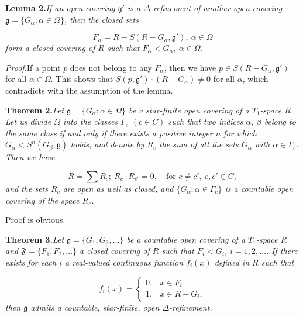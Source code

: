 \documentclass[11pt,a4paper,leqno]{article}
\newcommand{\g}{\mathfrak g}
\newcommand{\f}{\mathfrak F}
\newcommand{\thm}[2]{\par\medskip\textbf{Theorem #1.}\quad\textit{#2}\par}
\newcommand{\lem}[2]{\par\medskip\textbf{Lemma #1.}\quad\textit{#2}\par}
\newcommand{\proof}{\textit{Proof.}\quad}
\begin{document}
\lem{2}{If an open covering $\g'$ is a $\Delta$-refinement of another open covering $\g=\{G_\alpha;\alpha\in\Omega\}$, then the closed sets}
\[
F_\alpha=R-S(R-G_\alpha,\g'),\ \alpha\in\Omega
\]
\textit{form a closed covering of $R$ such that $F_\alpha<G_\alpha$, $\alpha\in\Omega$.}

\proof If a point $p$ does not belong to any $F_\alpha$, then we have $p\in S(R-G_\alpha,\g')$ for all $\alpha\in\Omega$. This shows that $S(p,\g')\cdot(R-G_\alpha)\ne0$ for all $\alpha$, which contradicts with the assumption of the lemma.
\newpage
\thm{2}{Let $\g=\{G_\alpha;\alpha\in\Omega\}$ be a star-finite open covering of a $T_1$-space $R$. Let us divide $\Omega$ into the classes $\Gamma_c$ $(c\in C)$ such that two indices $\alpha$, $\beta$ belong to the same class if and only if there exists a positive integer $n$ for which $G_\alpha<S^n(G_\beta,\g)$ holds, and denote by $R_c$ the sum of all the sets $G_\alpha$ with $\alpha\in\Gamma_c$. Then we have}
\[
R=\sum R_c;\ R_c\cdot R_{c'}=0,\quad\text{for }c\ne c',\ c,c'\in C,
\]
\textit{and the sets $R_c$ are open as well as closed, and $\{G_\alpha;\alpha\in\Gamma_c\}$ is a countable open covering of the space $R_c$.}

Proof is obvious.

\thm{3}{Let $\g=\{G_1,G_2,\ldots\}$ be a countable open covering of a $T_1$-space $R$ and $\f=\{F_1,F_2,\ldots\}$ a closed covering of $R$ such that $F_i<G_i$, $i=1,2,\ldots$. If there exists for each $i$ a real-valued continuous function $f_i(x)$ defined in $R$ such that}
\[
f_i(x)=\begin{cases}0,&x\in F_i\\1,&x\in R-G_i,\end{cases}
\]
\textit{then $\g$ admits a countable, star-finite, open $\Delta$-refinement.}
\end{document}
